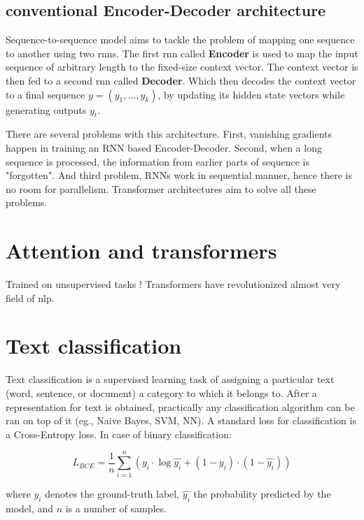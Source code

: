 \subsection{conventional Encoder-Decoder architecture}
Sequence-to-sequence \cite{sutskever2014sequence,cho2014learning} model aims to tackle the problem of mapping one sequence to another using two \Gls{rnn}s. The first \Gls{rnn} called \textbf{Encoder} is used to map the input sequence of arbitrary length to the fixed-size context vector. The context vector is then fed to a second \Gls{rnn} called \textbf{Decoder}. Which then decodes the context vector to a final sequence $y = (y_1,...,y_k)$, by updating its hidden state vectors while generating outputs $y_t$.

There are several problems with this architecture. First, vanishing gradients happen in training an RNN based Encoder-Decoder. Second, when a long sequence is processed, the information from earlier parts of sequence is "forgotten". And third problem, RNNs work in sequential manner, hence there is no room for parallelism. Transformer architectures aim to solve all these problems.

\section{Attention and transformers}\label{att_transformers}
Trained on unsupervised tasks !
Transformers have revolutionized almost very field of \Gls{nlp}. 

\section{Text classification}
Text classification is a supervised learning task of assigning a particular text (word, sentence, or document) a category to which it belongs to. After a representation for text is obtained, practically any classification algorithm can be ran on top of it (eg., Naive Bayes, SVM, NN). A standard loss for classification is a Cross-Entropy loss. In case of binary classification:

\begin{equation}
    L_{BCE} = \frac{1}{n} \sum_{i=1}^n ( y_i \cdot \log\hat{y_i} + (1-y_i)\cdot(1-\hat{y_i}))
\end{equation}

where $y_i$ denotes the ground-truth label, $\hat{y_i}$ the probability predicted by the model, and $n$ is a number of samples.

    
